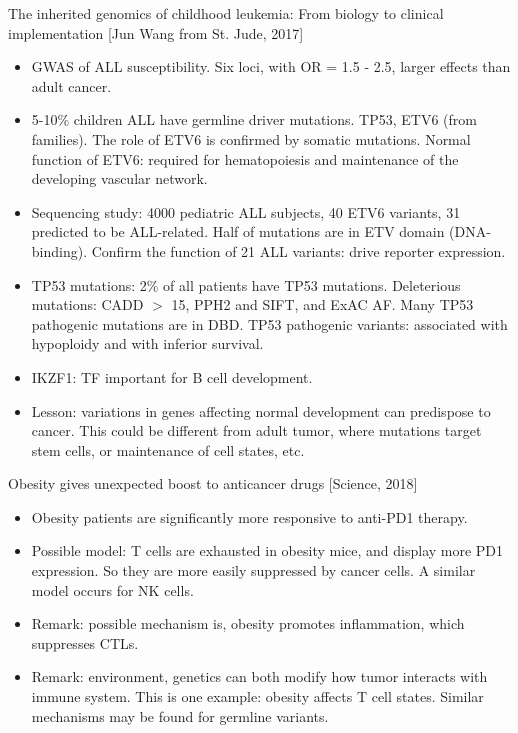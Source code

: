 \documentclass{report}
\begin{document}
The inherited genomics of childhood leukemia: From biology to clinical implementation [Jun Wang from St. Jude, 2017]
\begin{itemize}
	
	\item GWAS of ALL susceptibility. Six loci, with OR = 1.5 - 2.5, larger effects than adult cancer. 
	
	\item 5-10\% children ALL have germline driver mutations. TP53, ETV6 (from families). The role of ETV6 is confirmed by somatic mutations. Normal function of ETV6: required for hematopoiesis and maintenance of the developing vascular network. 
	
	\item Sequencing study: 4000 pediatric ALL subjects, 40 ETV6 variants, 31 predicted to be ALL-related. Half of mutations are in ETV domain (DNA-binding). Confirm the function of 21 ALL variants: drive reporter expression. 
	
	\item TP53 mutations: 2\% of all patients have TP53 mutations. Deleterious mutations: CADD $>$ 15, PPH2 and SIFT, and ExAC AF. Many TP53 pathogenic mutations are in DBD. TP53 pathogenic variants: associated with hypoploidy and with inferior survival.  
	
	\item IKZF1: TF important for B cell development. 
	
	\item Lesson: variations in genes affecting normal development can predispose to cancer. This could be different from adult tumor, where mutations target stem cells, or maintenance of cell states, etc.
\end{itemize}


Obesity gives unexpected boost to anticancer drugs [Science, 2018]
\begin{itemize}
	
	\item Obesity patients are significantly more responsive to anti-PD1 therapy. 
	
	\item Possible model: T cells are exhausted in obesity mice, and display more PD1 expression. So they are more easily suppressed by cancer cells. A similar model occurs for NK cells. 
	
	\item Remark: possible mechanism is, obesity promotes inflammation, which suppresses CTLs. 
	
	\item Remark: environment, genetics can both modify how tumor interacts with immune system. This is one example: obesity affects T cell states. Similar mechanisms may be found for germline variants. 
\end{itemize}
\end{document}
